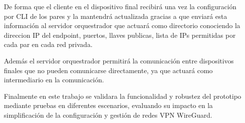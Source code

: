 \documentclass[letterpaper,12pt,oneside]{book}
\begin{document}
De forma que el cliente en el dispositivo final recibirá una vez la configuración por CLI de los pares y la mantendrá actualizada gracias a que enviará esta información al servidor orquestrador que actuará como directorio conociendo la direccion IP del endpoint, puertos, llaves publicas, lista de IPs permitidas por cada par en cada red privada.

Además el servidor orquestrador permitirá la comunicación entre dispositivos finales que no pueden comunicarse directamente, ya que actuará como intermediario en la comunicación.

Finalmente en este trabajo se validara la funcionalidad y robustez del prototipo mediante pruebas en diferentes escenarios, evaluando su impacto en la simplificación de la configuración y gestión de redes VPN WireGuard.
\end{document}
